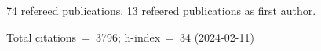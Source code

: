 74 refereed publications. 13 refeered publications as first author.

Total citations~=~3796; h-index~=~34 (2024-02-11)